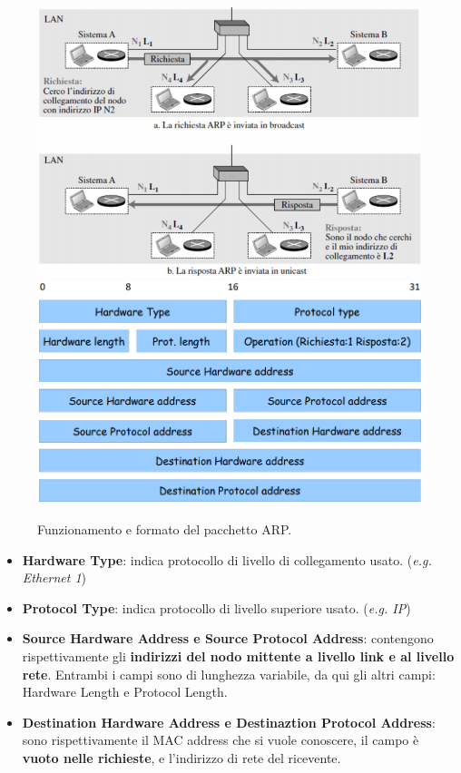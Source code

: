 \documentclass[11pt,a4paper,oneside]{book}
\theoremstyle{definition}
\begin{document}
\begin{figure}[!h]
	\includegraphics[scale=0.37]{Immagini/ARP_fun.png}
	\includegraphics[scale=0.3]{Immagini/ARP_pkt.png}
	\centering
	\caption{Funzionamento e formato del pacchetto ARP.}
\end{figure}

\pagebreak

\begin{itemize}
	\item \textbf{Hardware Type}: indica protocollo di livello di collegamento usato.
	      (\textit{e.g. Ethernet 1})
	\item \textbf{Protocol Type}: indica protocollo di livello superiore usato. (\textit{e.g. IP})
	\item \textbf{Source Hardware Address e Source Protocol Address}:
	      contengono rispettivamente gli \textbf{indirizzi del nodo mittente a livello link e al livello rete}. Entrambi i campi sono di lunghezza variabile, da qui gli altri campi: Hardware Length e Protocol Length.
	\item \textbf{Destination Hardware Address e Destinaztion Protocol Address}: sono rispettivamente il MAC address che si vuole conoscere, il campo è \textbf{vuoto nelle richieste}, e l'indirizzo di rete del ricevente.
\end{itemize}
\end{document}
